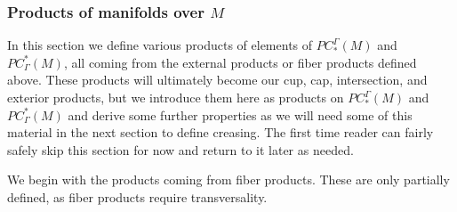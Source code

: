 \subsubsection{Products of manifolds over \texorpdfstring{$M$}{M}}

In this section we define various products of elements of $PC_*^\Gamma(M)$ and $PC^*_\Gamma(M)$, all coming from the external products or fiber products defined above.
These products will ultimately become our cup, cap, intersection, and exterior products, but we introduce them here as products on $PC_*^\Gamma(M)$ and $PC^*_\Gamma(M)$ and derive some further properties as we will need some of this material in the next section to define creasing.
The first time reader can fairly safely skip this section for now and return to it later as needed.

We begin with the products coming from fiber products.
These are only partially defined, as fiber products require transversality.

